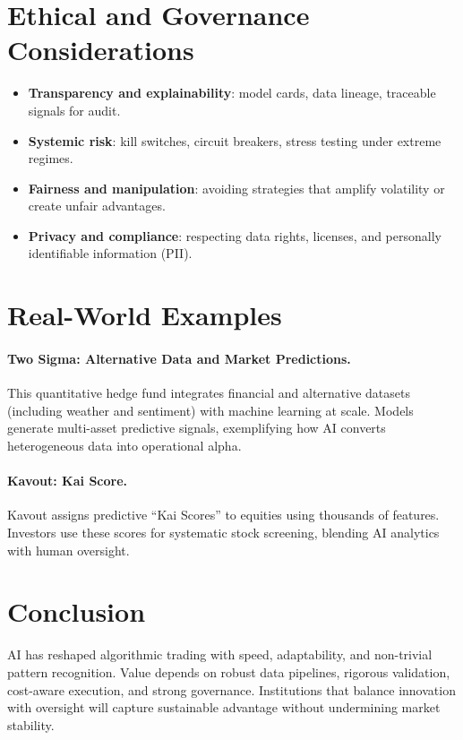 \documentclass[10pt, a4paper]{article}
\begin{document}
\section*{Ethical and Governance Considerations}
\begin{itemize}[leftmargin=*,itemsep=2pt]
  \item \textbf{Transparency and explainability}: model cards, data lineage, traceable signals for audit.
  \item \textbf{Systemic risk}: kill switches, circuit breakers, stress testing under extreme regimes.
  \item \textbf{Fairness and manipulation}: avoiding strategies that amplify volatility or create unfair advantages.
  \item \textbf{Privacy and compliance}: respecting data rights, licenses, and personally identifiable information (PII).
\end{itemize}

\newpage
\section*{Real-World Examples}
\paragraph{Two Sigma: Alternative Data and Market Predictions.}
This quantitative hedge fund integrates financial and alternative datasets (including weather and sentiment) with machine learning at scale. Models generate multi-asset predictive signals, exemplifying how AI converts heterogeneous data into operational alpha.
\paragraph{Kavout: Kai Score.}
Kavout assigns predictive ``Kai Scores'' to equities using thousands of features. Investors use these scores for systematic stock screening, blending AI analytics with human oversight.

\section*{Conclusion}
AI has reshaped algorithmic trading with speed, adaptability, and non-trivial pattern recognition. Value depends on robust data pipelines, rigorous validation, cost-aware execution, and strong governance. Institutions that balance innovation with oversight will capture sustainable advantage without undermining market stability.
\end{document}
